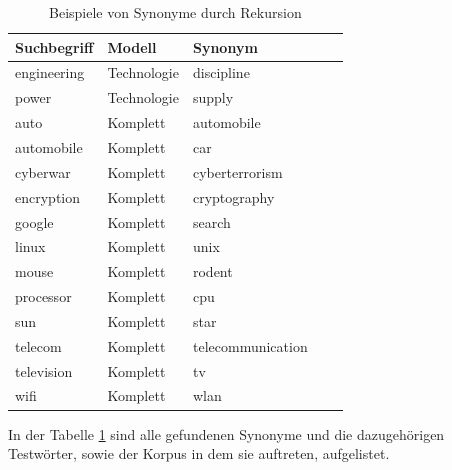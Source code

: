 \documentclass[12pt,a4paper]{report}
\begin{document}
\begin{table}[H]
\caption{Beispiele von Synonyme durch Rekursion}
\label{tab:bspsynoyme}
\begin{center}
\begin{tabular}{|l||l|l|l|l|}
\hline
\textbf{Suchbegriff} & \textbf{Modell} & \textbf{Synonym}   \\

\hline
 engineering & Technologie & discipline \\
 \hline	
 power	& Technologie	& supply	\\
 \hline
 \hline
auto & Komplett & automobile\\
\hline
automobile & Komplett & car\\
\hline
cyberwar & Komplett & cyberterrorism\\
\hline
encryption & Komplett & cryptography\\
\hline
google & Komplett & search\\
\hline
linux & Komplett & unix\\
\hline
mouse & Komplett & rodent\\
\hline
processor & Komplett & cpu\\
\hline
sun & Komplett & star\\
\hline
telecom & Komplett & telecommunication\\
\hline
television & Komplett & tv\\
\hline
wifi & Komplett & wlan\\
 	\hline
 
\end{tabular}
\end{center}
\end{table}
		
 In der Tabelle \ref{tab:bspsynoyme} sind alle gefundenen Synonyme und die dazugehörigen Testwörter, sowie der Korpus in dem sie auftreten, aufgelistet.
		
\end{document}
